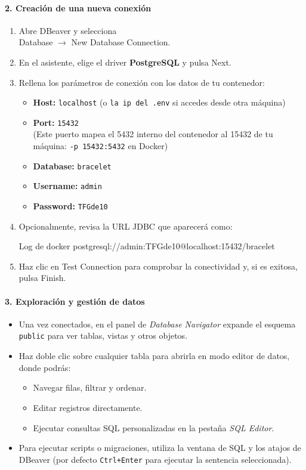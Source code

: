 \documentclass[12pt, a4paper]{article}
\begin{document}
\begin{umaappendices}
	\paragraph{2. Creación de una nueva conexión}  
	\begin{enumerate}
		\item Abre DBeaver y selecciona \\[4pt]
		\hspace*{1em}\textsf{Database} \(\to\) \textsf{New Database Connection}.
		\item En el asistente, elige el driver \textbf{PostgreSQL} y pulsa \textsf{Next}.
		\item Rellena los parámetros de conexión con los datos de tu contenedor:
		\begin{itemize}
			\item \textbf{Host:} \texttt{localhost} (o \texttt{la ip del .env} si accedes desde otra máquina)
			\item \textbf{Port:} \texttt{15432}\\
			(Este puerto mapea el 5432 interno del contenedor al 15432 de tu máquina: \texttt{-p 15432:5432} en Docker)
			\item \textbf{Database:} \texttt{bracelet}
			\item \textbf{Username:} \texttt{admin}
			\item \textbf{Password:} \texttt{TFGde10}
		\end{itemize}
		\item Opcionalmente, revisa la URL JDBC que aparecerá como:
		\begin{Terminal}{Log de docker}
			postgresql://admin:TFGde10@localhost:15432/bracelet
		\end{Terminal}
		\item Haz clic en \textsf{Test Connection} para comprobar la conectividad y, si es exitosa, pulsa \textsf{Finish}.
	\end{enumerate}
	
	\paragraph{3. Exploración y gestión de datos}  
	\begin{itemize}
		\item Una vez conectados, en el panel de \emph{Database Navigator} expande el esquema \texttt{public} para ver tablas, vistas y otros objetos.
		\item Haz doble clic sobre cualquier tabla para abrirla en modo editor de datos, donde podrás:
		\begin{itemize}
			\item Navegar filas, filtrar y ordenar.
			\item Editar registros directamente.
			\item Ejecutar consultas SQL personalizadas en la pestaña \emph{SQL Editor}.
	\end{itemize}
		\item Para ejecutar scripts o migraciones, utiliza la ventana de SQL y los atajos de DBeaver (por defecto \texttt{Ctrl+Enter} para ejecutar la sentencia seleccionada).
	\end{itemize}


\end{umaappendices}
\end{document}
